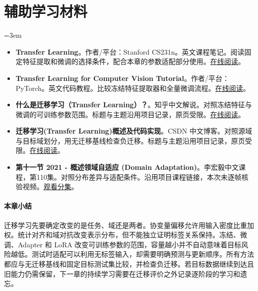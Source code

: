 \section*{辅助学习材料}
\begingroup
\emergencystretch=3em
\begin{itemize}
\item \textbf{Transfer Learning}。作者/平台：Stanford CS231n。英文课程笔记。阅读固定特征提取和微调的选择条件，配合本章的参数适配部分使用。\href{https://cs231n.github.io/transfer-learning/}{在线阅读}。
\item \textbf{Transfer Learning for Computer Vision Tutorial}。作者/平台：PyTorch。英文代码教程。比较冻结特征提取器和全量微调流程。\href{https://docs.pytorch.org/tutorials/beginner/transfer\_learning\_tutorial.html}{在线阅读}。
\item \textbf{什么是迁移学习（Transfer Learning）？}。知乎中文解说。对照冻结特征与微调的可训练参数范围。标题与主题沿用项目记录，原页受限。\href{https://zhuanlan.zhihu.com/p/1899236885408256815}{在线阅读}。
\item \textbf{迁移学习(Transfer Learning)概述及代码实现}。CSDN 中文博客。对照源域与目标域划分，用无迁移基线检查负迁移。标题与主题沿用项目记录，原页受限。\href{https://blog.csdn.net/weixin\_49272172/article/details/115791703}{在线阅读}。
\item \textbf{第十一节 2021 - 概述领域自适应 (Domain Adaptation)}。李宏毅中文课程，第110集。对照分布差异与适配条件。沿用项目课程链接，本次未逐帧核验视频。\href{https://www.bilibili.com/video/BV1Wv411h7kN/?p=110}{观看分集}。
\end{itemize}
\endgroup

\paragraph{本章小结}
迁移学习先要确定改变的是任务、域还是两者。协变量偏移允许用输入密度比重加权。统计对齐和域对抗改变表示分布，但不能独立证明标签关系保持。冻结、微调、Adapter 和 LoRA 改变可训练参数的范围，容量越小并不自动意味着目标风险越低。测试时适配可以利用无标签输入，却需要明确预测与更新顺序。所有方法都应与无迁移基线和固定目标测试集比较，并检查负迁移。若目标数据继续到达且旧能力仍需保留，下一章的持续学习需要在迁移评价之外记录逐阶段的学习和遗忘。
